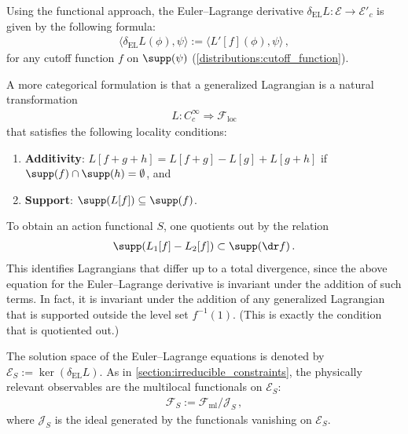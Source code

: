     Using the functional approach, the Euler--Lagrange derivative $\delta_{\text{EL}}L:\mathcal{E}\rightarrow\mathcal{E}'_c$ is given by the following formula:
    \begin{gather}
        \bigl\langle\delta_{\text{EL}}L(\phi),\psi\bigr\rangle := \bigl\langle L'[f](\phi),\psi\bigr\rangle\,,
    \end{gather}
    for any cutoff function $f$ on $\supp(\psi)$ (\cref{distributions:cutoff_function}).
    \begin{remark}[Functoriality]
        A more categorical formulation is that a generalized Lagrangian is a natural transformation
        \begin{gather}
            L:C^\infty_c\Rightarrow\mathcal{F}_{\text{loc}}
        \end{gather}
        that satisfies the following locality conditions:
        \begin{enumerate}
            \item\textbf{Additivity}: $L[f+g+h] = L[f+g]-L[g]+L[g+h]$ if $\supp(f)\cap\supp(h)=\emptyset$, and
            \item\textbf{Support}: $\supp(L[f])\subseteq\supp(f)$.
        \end{enumerate}
        To obtain an action functional $S$, one quotients out by the relation
        \begin{gather}
            \supp(L_1[f]-L_2[f])\subset\supp(\dr f)\,.
        \end{gather}
        This identifies Lagrangians that differ up to a total divergence, since the above equation for the Euler--Lagrange derivative is invariant under the addition of such terms. In fact, it is invariant under the addition of any generalized Lagrangian that is supported outside the level set $f^{-1}(1)$. (This is exactly the condition that is quotiented out.)
    \end{remark}

    The solution space of the Euler--Lagrange equations is denoted by $\mathcal{E}_S := \ker(\delta_{\text{EL}}L)$. As in \cref{section:irreducible_constraints}, the physically relevant observables are the multilocal functionals on $\mathcal{E}_S$:
    \begin{gather}
        \label{aqft:solution_space}
        \mathcal{F}_S := \mathcal{F}_{\text{ml}}/\mathcal{J}_S\,,
    \end{gather}
    where $\mathcal{J}_S$ is the ideal generated by the functionals vanishing on $\mathcal{E}_S$.

